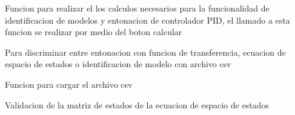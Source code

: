 \documentclass[letterpaper,10pt,spanish]{sphinxmanual}
\begin{document}

\begin{fulllineitems}
\label{\detokenize{codigos/TuningHandler:TuningHandler.calcular_csv}}
Funcion para realizar el los calculos necesarios para la funcionalidad de identificacion de modelos y entonacion de controlador PID, el llamado a esta funcion se realizar por medio del boton calcular

\end{fulllineitems}


\begin{fulllineitems}
\label{\detokenize{codigos/TuningHandler:TuningHandler.chequeo_de_accion}}
Para discriminar entre entonacion con funcion de transferencia, ecuacion de espacio de estados o identificacion de modelo con archivo csv

\end{fulllineitems}


\begin{fulllineitems}
\label{\detokenize{codigos/TuningHandler:TuningHandler.csv_path}}
Funcion para cargar el archivo csv

\end{fulllineitems}


\begin{fulllineitems}
\label{\detokenize{codigos/TuningHandler:TuningHandler.ssA_validator}}
Validacion de la matriz de estados de la ecuacion de espacio de estados

\end{fulllineitems}
\end{document}
